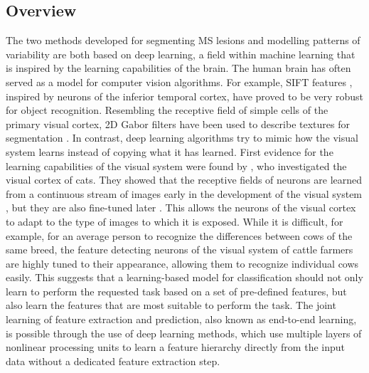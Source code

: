 \subsection{Overview}

The two methods developed for segmenting MS lesions and modelling patterns of
variability are both based on deep learning, a field within machine learning
that is inspired by the learning capabilities of the brain. The human brain has
often served as a model for computer vision algorithms. For example, SIFT
features \citep{lowe1999}, inspired by neurons of the inferior temporal cortex,
have proved to be very robust for object recognition. Resembling the receptive
field of simple cells of the primary visual cortex, 2D Gabor filters have been
used to describe textures for segmentation \citep{grigorescu2002}. In contrast,
deep learning algorithms try to mimic how the visual system learns instead of
copying what it has learned. First evidence for the learning capabilities of the
visual system were found by \citep{wiesel1963}, who investigated the visual
cortex of cats. They showed that the receptive fields of neurons are learned
from a continuous stream of images early in the development of the visual system
\citep{wiesel1963}, but they are also fine-tuned later \citep{karni1991}.
This allows the neurons of the visual cortex to adapt to the type of images to
which it is exposed. While it is difficult, for example, for an average person
to recognize the differences between cows of the same breed, the feature
detecting neurons of the visual system of cattle farmers are highly tuned to
their appearance, allowing them to recognize individual cows easily. This
suggests that a learning-based model for classification should not only learn to
perform the requested task based on a set of pre-defined features, but also
learn the features that are most suitable to perform the task. The joint
learning of feature extraction and prediction, also known as end-to-end
learning, is possible through the use of deep learning methods, which use
multiple layers of nonlinear processing units to learn a feature hierarchy
directly from the input data without a dedicated feature extraction step.


